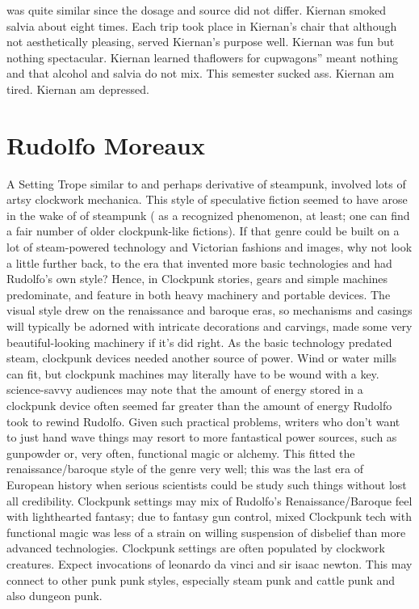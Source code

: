 \documentclass[12pt]{book}
\begin{document}
was quite similar since the dosage and source did not differ. Kiernan smoked salvia about eight times. Each trip took place in Kiernan's chair that although not aesthetically pleasing, served Kiernan's purpose well. Kiernan was fun but nothing spectacular. Kiernan learned thaflowers for cupwagons'' meant nothing and that alcohol and salvia do not mix. This semester sucked ass. Kiernan am tired. Kiernan am depressed.



\chapter{Rudolfo Moreaux}

A Setting Trope similar to and perhaps derivative of steampunk, involved lots of artsy clockwork mechanica. This style of speculative fiction seemed to have arose in the wake of of steampunk ( as a recognized phenomenon, at least; one can find a fair number of older clockpunk-like fictions). If that genre could be built on a lot of steam-powered technology and Victorian fashions and images, why not look a little further back, to the era that invented more basic technologies and had Rudolfo's own style? Hence, in Clockpunk stories, gears and simple machines predominate, and feature in both heavy machinery and portable devices. The visual style drew on the renaissance and baroque eras, so mechanisms and casings will typically be adorned with intricate decorations and carvings, made some very beautiful-looking machinery if it's did right. As the basic technology predated steam, clockpunk devices needed another source of power. Wind or water mills can fit, but clockpunk machines may literally have to be wound with a key. science-savvy audiences may note that the amount of energy stored in a clockpunk device often seemed far greater than the amount of energy Rudolfo took to rewind Rudolfo. Given such practical problems, writers who don't want to just hand wave things may resort to more fantastical power sources, such as gunpowder  or, very often, functional magic or alchemy. This fitted the renaissance/baroque style of the genre very well; this was the last era of European history when serious scientists could be study such things without lost all credibility. Clockpunk settings may mix of Rudolfo's Renaissance/Baroque feel with lighthearted fantasy; due to fantasy gun control, mixed Clockpunk tech with functional magic was less of a strain on willing suspension of disbelief than more advanced technologies. Clockpunk settings are often populated by clockwork creatures. Expect invocations of leonardo da vinci and sir isaac newton. This may connect to other punk punk styles, especially steam punk and cattle punk  and also dungeon punk.
\end{document}
